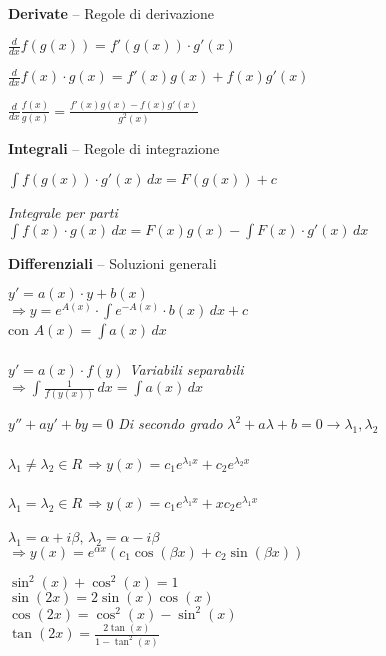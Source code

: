 \documentclass[10pt]{article}
\begin{document}
\begin{multicols}{2}
\textbf{Derivate} -- Regole di derivazione
\begin{center}
	\begin{list}{}{}
		\item $\frac{d}{dx} f(g(x)) = f'(g(x)) \cdot g'(x)$
		\item $\frac{d}{dx} f(x) \cdot g(x) = f'(x)g(x) + f(x)g'(x)$
		\item $\frac{d}{dx} \frac{f(x)}{g(x)} = \frac{f'(x)g(x) - f(x)g'(x)}{g^2(x)}$
	\end{list}
\end{center}
\columnbreak
\textbf{Integrali} -- Regole di integrazione
\begin{center}
	\begin{list}{}{}
		\item $\int f(g(x))\cdot g'(x)\,dx = F(g(x)) + c$
		\item \textit{Integrale per parti}\\$\int f(x)\cdot g(x)\,dx = F(x)g(x) - \int F(x)\cdot g'(x)\,dx$
	\end{list}
\end{center}
\end{multicols}
\textbf{Differenziali} -- Soluzioni generali
\begin{multicols}{2}
	$y' = a(x)\cdot y + b(x)$\\
	$\Rightarrow y = e^{A(x)}\cdot \int e^{-A(x)}\cdot b(x)\,dx + c$\\
	con $A(x) = \int a(x)\,dx$\\\\

	$y' = a(x)\cdot f(y)$ \textit{Variabili separabili}\\
	$\Rightarrow \int \frac{1}{f(y(x))}\,dx = \int a(x)\,dx$\\
	\columnbreak
	
	$y'' + ay' + by = 0$ \textit{Di secondo grado}
	$\lambda^2 + a\lambda + b = 0 \rightarrow \lambda_1,\lambda_2$\\\\
	$\lambda_1 \neq \lambda_2 \in R$\,$\Rightarrow y(x) = c_1e^{\lambda_1x} + c_2e^{\lambda_2x}$\\\\
	$\lambda_1 = \lambda_2 \in R$\,$\Rightarrow y(x) = c_1e^{\lambda_1x} + xc_2e^{\lambda_1x}$\\\\
	$\lambda_1 = \alpha + i\beta,\, \lambda_2 = \alpha - i\beta$\\$\Rightarrow y(x) = e^{\alpha x}(c_1\cos(\beta x) + c_2\sin(\beta x))$
\end{multicols}
\begin{multicols}{4}
$\sin^2(x) + \cos^2(x) = 1$\\
$\sin(2x) = 2\sin(x)\cos(x)$\\
$\cos(2x) = \cos^2(x) - \sin^2(x)$\\
$\tan(2x) = \frac{2\tan(x)}{1 - \tan^2(x)} $
\end{multicols}
\end{document}
